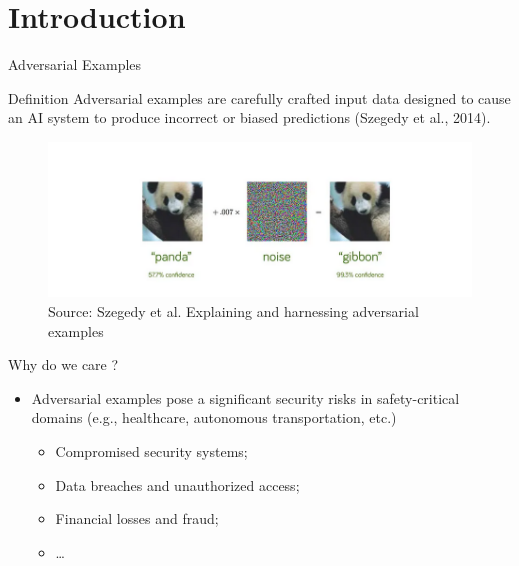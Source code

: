 \section{Introduction}

\begin{frame}{Adversarial Examples}

    \begin{alertblock}{Definition}
        Adversarial examples are carefully crafted input data designed to cause an AI system to produce incorrect or biased predictions (Szegedy et al., 2014).
    \end{alertblock}
    \begin{center}
        \begin{figure}
            \includegraphics[width=0.70\linewidth]{img/AdvExample.png}
            \\ {\tiny Source: Szegedy et al. Explaining and harnessing adversarial examples}
        \end{figure}
    \end{center}

\end{frame}

\begin{frame}{Why do we care ?}

    \begin{itemize}
        \item Adversarial examples pose a significant security risks in safety-critical domains (e.g., healthcare, autonomous transportation, etc.)
        \begin{itemize}
            \item Compromised security systems;
            \item Data breaches and unauthorized access;
            \item Financial losses and fraud;
            \item \dots
        \end{itemize}
    \end{itemize}

\end{frame}

